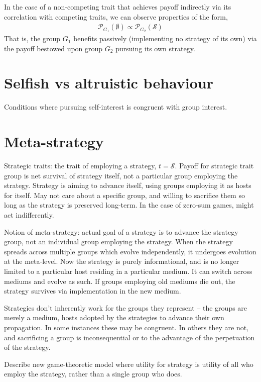 \documentclass[aps,rmp,twocolumn,amsmath,amssymb,nofootinbib,superscriptaddress]{revtex4}
\begin{document}
In the case of a non-competing trait that achieves payoff indirectly via its correlation with competing traits, we can observe properties of the form,
\begin{align}
	\mathcal{P}_{G_1}(\emptyset) \propto \mathcal{P}_{G_2}(\mathcal{S})
\end{align}
That is, the group $G_1$ benefits passively (implementing no strategy of its own) via the payoff bestowed upon group $G_2$ pursuing its own strategy.

\section{Selfish vs altruistic behaviour}

Conditions where pursuing self-interest is congruent with group interest.

\section{Meta-strategy}

Strategic traits: the trait of employing a strategy, $t=\mathcal{S}$. Payoff for strategic trait group is net survival of strategy itself, not a particular group employing the strategy. Strategy is aiming to advance itself, using groups employing it as hosts for itself. May not care about a specific group, and willing to sacrifice them so long as the strategy is preserved long-term. In the case of zero-sum games, might act indifferently.

Notion of meta-strategy: actual goal of a strategy is to advance the strategy group, not an individual group employing the strategy. When the strategy spreads across multiple groups which evolve independently, it undergoes evolution at the meta-level. Now the strategy is purely informational, and is no longer limited to a particular host residing in a particular medium. It can switch across mediums and evolve as such. If groups employing old mediums die out, the strategy survives via implementation in the new medium.

Strategies don't inherently work for the groups they represent -- the groups are merely a medium, hosts adopted by the strategies to advance their own propagation. In some instances these may be congruent. In others they are not, and sacrificing a group is inconsequential or to the advantage of the perpetuation of the strategy.

Describe new game-theoretic model where utility for strategy is utility of all who employ the strategy, rather than a single group who does.
\end{document}
